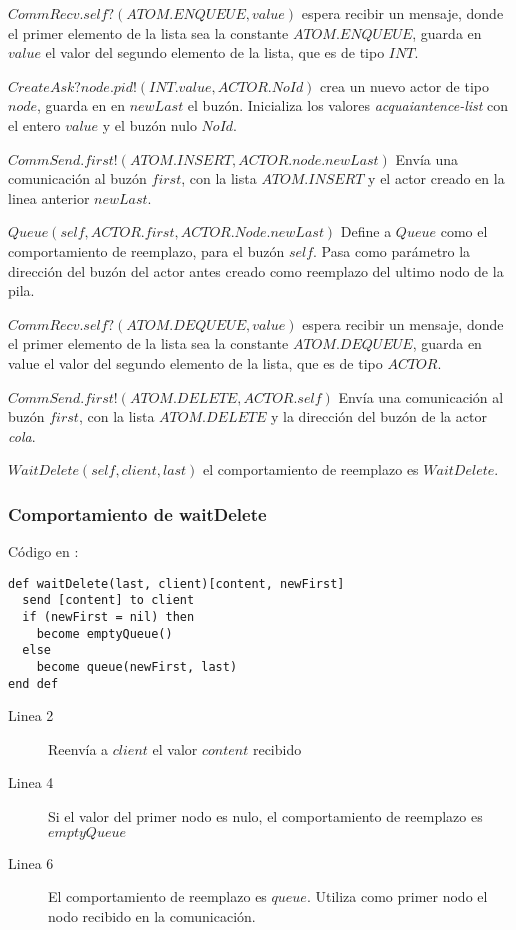 \begin{description}
 \item $CommRecv.self?(ATOM.ENQUEUE, value)$ espera recibir un mensaje, donde el primer elemento de la lista sea la constante $ATOM.ENQUEUE$, guarda en $value$ el valor del segundo elemento de la lista, que es de tipo $INT$.
 \item $CreateAsk?node.pid!(INT.value, ACTOR.NoId)$ crea un nuevo actor de tipo $node$, guarda en en $newLast$ el buzón. Inicializa los valores \textit{acquaiantence-list} con el entero $value$ y el buzón nulo $NoId$.
 \item $CommSend.first!(ATOM.INSERT, ACTOR.node.newLast)$ Envía una comunicación al buzón $first$, con la lista $ATOM.INSERT$ y el actor creado en la linea anterior $newLast$. 
 \item $Queue(self, ACTOR.first, ACTOR.Node.newLast)$ Define a $Queue$ como el comportamiento de reemplazo, para el buzón $self$. Pasa como parámetro la dirección del buzón del actor antes creado como reemplazo del ultimo nodo de la pila.
 \item $CommRecv.self?(ATOM.DEQUEUE, value)$ espera recibir un mensaje, donde el primer elemento de la lista sea la constante $ATOM.DEQUEUE$, guarda en value el valor del segundo elemento de la lista, que es de tipo $ACTOR$.
 \item $CommSend.first!(ATOM.DELETE, ACTOR.self)$ Envía una comunicación al buzón $first$, con la lista $ATOM.DELETE$ y la dirección del buzón de la actor \textit{cola}. 
 \item $WaitDelete(self, client, last)$ el comportamiento de reemplazo es $WaitDelete$.
 \end{description}

\subsubsection*{Comportamiento de waitDelete}

Código en \SAL:

\begin{lstlisting}[language=sal, style=simple]
def waitDelete(last, client)[content, newFirst]
  send [content] to client
  if (newFirst = nil) then
    become emptyQueue()
  else
    become queue(newFirst, last)
end def
\end{lstlisting}

\begin{description}
 \item [Linea 2] Reenvía a $client$ el valor $content$ recibido
 \item [Linea 4] Si el valor del primer nodo es nulo, el comportamiento de reemplazo es $emptyQueue$
 \item [Linea 6] El comportamiento de reemplazo es $queue$. Utiliza como primer nodo el nodo recibido en la comunicación.
\end{description}

